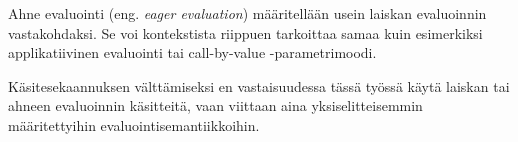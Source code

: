 Ahne evaluointi (eng. \textit{eager evaluation}) määritellään usein laiskan evaluoinnin vastakohdaksi. Se voi kontekstista riippuen tarkoittaa samaa kuin esimerkiksi applikatiivinen evaluointi tai call-by-value -parametrimoodi.

Käsitesekaannuksen välttämiseksi en vastaisuudessa tässä työssä käytä laiskan tai ahneen evaluoinnin käsitteitä, vaan viittaan aina yksiselitteisemmin määritettyihin evaluointisemantiikkoihin.



% 
% 
% 
% 

%
%
%
%
%

